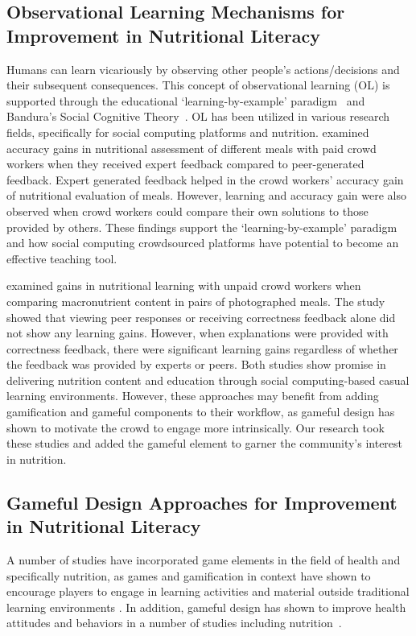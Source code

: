 \subsection{Observational Learning Mechanisms for Improvement in Nutritional Literacy}
Humans can learn vicariously by observing other people's actions/decisions and their subsequent consequences. This concept of observational learning (OL) is supported through the educational
`learning-by-example’ paradigm~\cite{anderson1997role,atkinson2000learning,brown1988preschool} and Bandura's Social Cognitive Theory~\cite{bandura1989human,bandura1998health}. OL has been utilized in various research fields, specifically for social computing platforms and nutrition. \cite{mamykina2016learning} examined accuracy gains in nutritional assessment of different meals with paid crowd workers when they received expert feedback compared to peer-generated feedback. Expert generated feedback helped in the crowd workers' accuracy gain of nutritional evaluation of meals. However, learning and accuracy gain were also observed when crowd workers could compare their own solutions to those provided by others. These findings support the `learning-by-example’ paradigm and how social computing crowdsourced platforms have potential to become an effective teaching tool. 

\cite{burgermaster2017role} examined gains in nutritional learning with unpaid crowd workers when comparing macronutrient content in pairs of photographed meals. The study showed that viewing peer responses or receiving correctness feedback alone did not show any learning gains. However, when explanations were provided with correctness feedback, there were significant learning gains regardless of whether the feedback was provided by experts or peers. Both studies show promise in delivering nutrition content and education through social computing-based casual learning environments. However, these approaches may benefit from adding gamification and gameful components to their workflow, as gameful design has shown to motivate the crowd to engage more intrinsically. Our research took these studies and added the gameful element to garner the community's interest in nutrition. 

\vspace{-5pt}
\subsection{Gameful Design Approaches for Improvement in Nutritional Literacy}
A number of studies have incorporated game elements in the field of health and specifically nutrition, as games and  gamification in context have shown to encourage players to engage in learning activities and material outside traditional learning environments \cite{alessi1991computer, blumberg2014serious,chen2014healthifying,huizenga2009mobile,jui2011game,mueller2011designing,papastergiou2009exploring,richards2014beyond}. In addition, gameful design has shown to improve health attitudes and behaviors in a number of studies including nutrition~\cite{deterding2011game,grimes2010let, johnson2016gamification,kyfonidis2019making,peng2009design,orji2013lunchtime,orji2017improving}.


